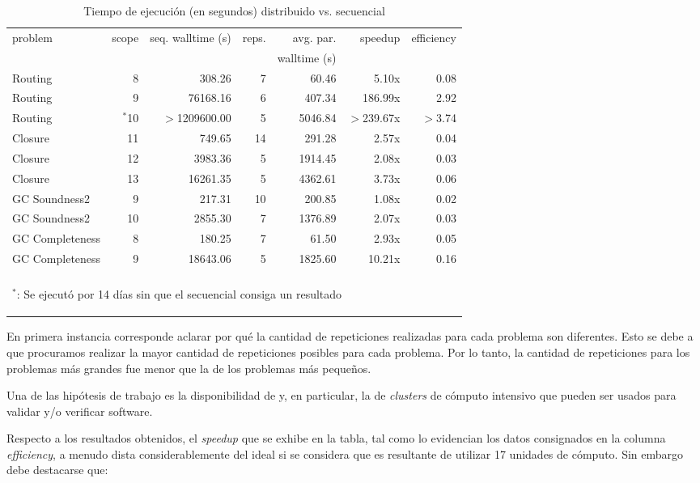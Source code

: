 \begin{table}
	\footnotesize
	\begin{tabular}{lrrrrrr}
		\toprule
		problem	&	scope	&	seq. walltime (s)	&	reps. & avg. par.	&	speedup	&	efficiency \\
			&		&	&	 & walltime (s)	&		&	 \\
		\cmidrule(r){1-7}
		Routing	&	8	&	308.26	&		7 & 60.46	& 5.10x	&	0.08 \\
		Routing	&	9	&	76168.16	&	6& 407.34	& 	186.99x	&	2.92 \\
		Routing	&	$^*$10	&	$>$1209600.00	&	5 & 5046.84	&	$>$239.67x	&	$>$3.74 \\
		\cmidrule(r){1-7}
		Closure	&	11	&	749.65	&	14 & 291.28	&	2.57x	&	0.04 \\
		Closure	&	12	&	3983.36	&	5 & 1914.45	&	2.08x	&	0.03 \\
		Closure	&	13	&	16261.35	& 5 &	4362.61	&	3.73x	&	0.06 \\
		\cmidrule(r){1-7}
		GC Soundness2	&	9	&	217.31	&	10 & 200.85	&	1.08x	&	0.02 \\
		GC Soundness2	&	10	&	 2855.30	&	7 &1376.89	&	2.07x	&	0.03 \\
		\cmidrule(r){1-7}
		GC Completeness	&	8	&	180.25	&	7 & 61.50	&	2.93x	&	0.05 \\
		GC Completeness	&	9	&	18643.06	&	5 & 1825.60	&	10.21x	&	0.16 \\
		\bottomrule
		\\
		\multicolumn{7}{l}{\begin{tiny}$^*$: Se ejecutó por 14 días sin que el \ssolver secuencial consiga un resultado\end{tiny}}
	\end{tabular}
	\caption{Tiempo de ejecución (en segundos) distribuido vs. secuencial}
	\label{tab:resultados}
\end{table}

En primera instancia corresponde aclarar por qué la cantidad de repeticiones
realizadas para cada problema son diferentes. Esto se debe a que procuramos
realizar la mayor cantidad de repeticiones posibles para cada problema. Por lo
tanto, la cantidad de repeticiones para los problemas más grandes fue menor
que la de los problemas más pequeños.

Una de las hipótesis de trabajo es la disponibilidad de \hard y, en
particular, la de \emph{clusters} de cómputo intensivo que pueden ser usados
para validar y/o verificar software.

Respecto a los resultados obtenidos, el \emph{speedup} que se exhibe en la
tabla, tal como lo evidencian los datos consignados en la columna
\emph{efficiency}, a menudo dista considerablemente del ideal si se considera
que es resultante de utilizar 17 unidades de cómputo. Sin embargo debe
destacarse que:

